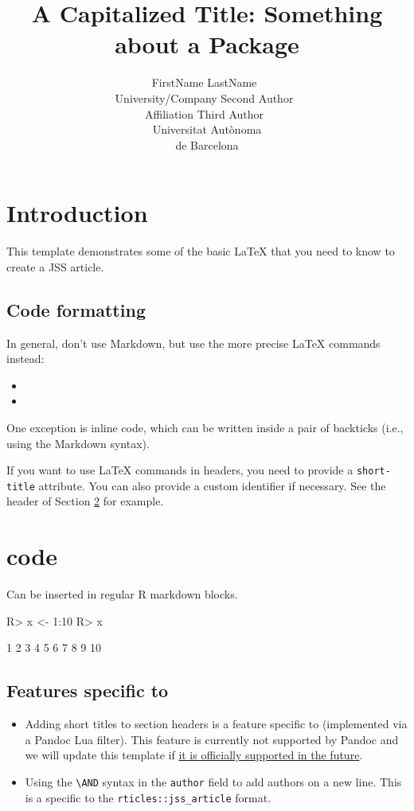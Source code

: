 \documentclass[
]{jss}
\author{
FirstName
LastName~\orcidlink{0000-0000-0000-0000}\\University/Company \And Second
Author~\orcidlink{0000-0000-0000-0000}\\Affiliation \AND Third
Author~\orcidlink{0000-0000-0000-0000}\\Universitat Autònoma\\
de Barcelona
}
\title{A Capitalized Title: Something about a Package \pkg{foo}}
\providecommand{\tightlist}{%
  \setlength{\itemsep}{0pt}\setlength{\parskip}{0pt}}
\begin{document}
\hypertarget{introduction}{%
\section{Introduction}\label{introduction}}

This template demonstrates some of the basic LaTeX that you need to know
to create a JSS article.

\hypertarget{code-formatting}{%
\subsection{Code formatting}\label{code-formatting}}

In general, don't use Markdown, but use the more precise LaTeX commands
instead:

\begin{itemize}
\item
\item
\end{itemize}

One exception is inline code, which can be written inside a pair of
backticks (i.e., using the Markdown syntax).

If you want to use LaTeX commands in headers, you need to provide a
\texttt{short-title} attribute. You can also provide a custom identifier
if necessary. See the header of Section \ref{r-code} for example.

\section[R code]{ code}\label{r-code}

Can be inserted in regular R markdown blocks.

\begin{CodeChunk}
\begin{CodeInput}
R> x <- 1:10
R> x
\end{CodeInput}
\begin{CodeOutput}
 [1]  1  2  3  4  5  6  7  8  9 10
\end{CodeOutput}
\end{CodeChunk}

\subsection[Features specific to rticles]{Features specific to
}\label{features-specific-to}

\begin{itemize}
\tightlist
\item
  Adding short titles to section headers is a feature specific to
   (implemented via a Pandoc Lua filter). This feature is
  currently not supported by Pandoc and we will update this template if
  \href{https://github.com/jgm/pandoc/issues/4409}{it is officially
  supported in the future}.
\item
  Using the \texttt{\textbackslash{}AND} syntax in the \texttt{author}
  field to add authors on a new line. This is a specific to the
  \texttt{rticles::jss\_article} format.
\end{itemize}
\end{document}
